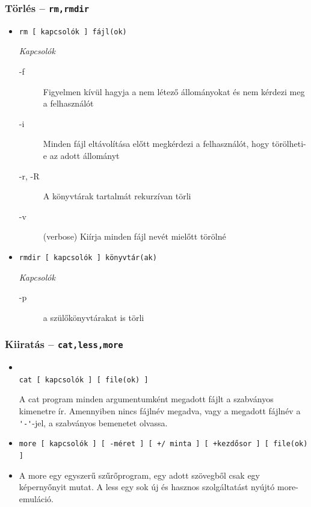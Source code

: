 \subsubsection*{Törlés -- \texttt{rm,rmdir}}
\begin{itemize}
\item[] 
	\hfill\texttt{rm [ kapcsolók ] fájl(ok)}
	\medskip
	
	\textit{Kapcsolók}
	\begin{description}
	\item[-f] Figyelmen kívül hagyja a nem létező állományokat és nem kérdezi meg a felhasználót
	\item[-i]  Minden fájl eltávolítása előtt megkérdezi a felhasználót, hogy törölheti-e az adott állományt
	\item[-r, -R] A könyvtárak tartalmát rekurzívan törli
	\item[-v] (verbose) Kiírja minden fájl nevét mielőtt törölné
	\end{description}
	
\item[] 
	\hfill\texttt{rmdir [ kapcsolók ] könyvtár(ak)}
	\medskip
	
	\textit{Kapcsolók}
	\begin{description}
	\item[-p] a szülőkönyvtárakat is törli
	\end{description}
\end{itemize}


\subsubsection*{Kiiratás -- \texttt{cat,less,more}}
\begin{itemize}
\item[] 
\\
\hspace*{1em}\hfill\texttt{cat [ kapcsolók ] [ file(ok) ]}
	
	
	A cat program minden argumentumként megadott fájlt a szabványos kimenetre ír. Amennyiben nincs fájlnév megadva, vagy a megadott fájlnév a \verb.'-'.-jel, a szabványos bemenetet olvassa. 

\item[] 
	\hfill\texttt{more [ kapcsolók ] [ -méret ] [ +/ minta ] [ +kezdősor ] [  file(ok) ]}
\item[] 
	\hfill\texttt{}
	
	A more egy egyszerű szűrőprogram, egy adott szövegből csak egy képernyőnyit mutat. A less egy sok új és hasznos szolgáltatást nyújtó more-emuláció. 
\end{itemize}

